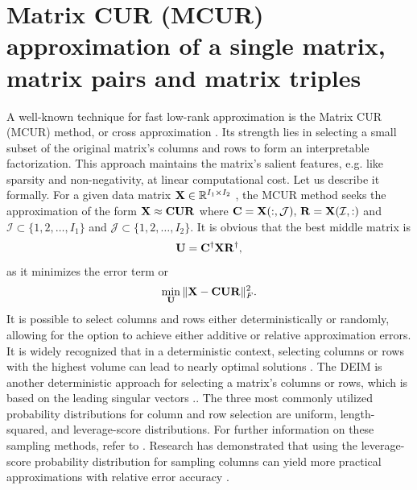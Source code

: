 \documentclass[preprint,12pt]{elsarticle}
\theoremstyle{definition}
\newcommand{\R}{{\bf R}}
\newcommand{\X}{{\bf X}}
\newcommand{\C}{{\bf C}}
\newcommand{\U}{{\bf U}}
\begin{document}
\section{Matrix CUR (MCUR) approximation of a single matrix, matrix pairs and matrix triples}\label{Sec:MACA}
A well-known technique for fast low-rank approximation is the Matrix CUR (MCUR) method, or cross approximation \cite{goreinov1997theory}. Its strength lies in selecting a small subset of the original matrix's columns and rows to form an interpretable factorization. This approach maintains the matrix's salient features, e.g. like sparsity and non-negativity,  at linear computational cost.  Let us describe it formally. For a given data matrix $\X\in\mathbb{R}^{I_1\times I_2}$ , the MCUR method seeks the approximation of the form $\X\approx\C\U\R$ where $\C=\X(:,\mathcal{J}),\,\R=\X(\mathcal{I},:)$ and $\mathcal{I}\subset \{1,2,\ldots,I_1\}$ and $\mathcal{J}\subset\{1,2,\ldots,I_2\}$. It is obvious that the best middle matrix is 
\begin{eqnarray}\label{midmatrix}
\U=\C^{\dag}\X{\R}^{\dag},
\end{eqnarray}
as it minimizes the error term or
\begin{eqnarray}
 \min_{\U} \|\X-\C\U\R\|^2_F. 
\end{eqnarray}
It is possible to select columns and rows either deterministically or randomly, allowing for the option to achieve either additive or relative approximation errors. It is widely recognized that in a deterministic context, selecting columns or rows with the highest volume can lead to nearly optimal solutions \cite{goreinov2010find}. The DEIM is another deterministic approach for selecting a matrix's columns or rows, which is based on the leading singular vectors \cite{sorensen2016deim}.. The three most commonly utilized probability distributions for column and row selection are uniform, length-squared, and leverage-score distributions. For further information on these sampling methods, refer to \cite{mahoney2011randomized}. Research has demonstrated that using the leverage-score probability distribution for sampling columns can yield more practical approximations with relative error accuracy \cite{drineas2008relative}.
\end{document}
